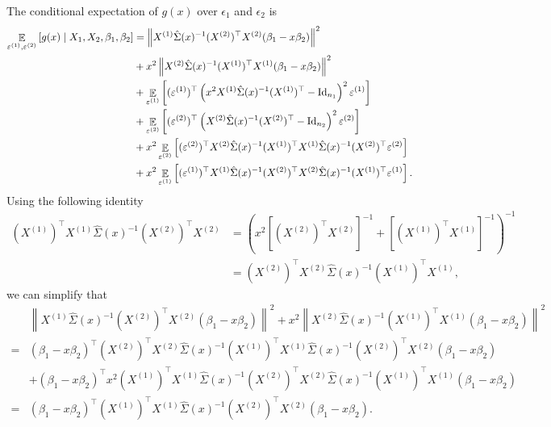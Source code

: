 The conditional expectation of $g(x)$ over $\epsilon_1$ and $\epsilon_2$ is
\begin{align}
\mathop{\mathbb{E}}_{\varepsilon^{(1)}, \varepsilon^{(2)}}\left[ g(x) \mid X_1, X_2 ,\beta_1,\beta_2 \right]
&= \left\| X^{(1)} \hat\Sigma(x)^{-1} (X^{(2)})^\top X^{(2)} (\beta_1-x\beta_2)\right\|^2 \nonumber\\
&+x^2 \left\| X^{(2)} \hat\Sigma(x)^{-1} (X^{(1)})^\top X^{(1)} (\beta_1-x\beta_2)\right\|^2  \nonumber\\
& + \mathop{\mathbb{E}}_{\varepsilon^{(1)}}\left[ (\varepsilon^{(1)})^\top \left(x^2 X^{(1)}\hat \Sigma(x)^{-1} (X^{(1)})^\top-\operatorname{Id}_{n_1}\right)^2\varepsilon^{(1)} \right] \nonumber\\
&+\mathop{\mathbb{E}}_{ \varepsilon^{(2)}}\left[ (\varepsilon^{(2)})^\top \left(X^{(2)}\hat \Sigma(x)^{-1} (X^{(2)})^\top-\operatorname{Id}_{n_2}\right)^2\varepsilon^{(2)} \right]   \nonumber\\
&+  x^2 \mathop{\mathbb{E}}_{ \varepsilon^{(2)}}\left[  (\varepsilon^{(2)} )^\top X^{(2)}\hat \Sigma(x)^{-1}  (X^{(1)})^\top X^{(1)}\hat\Sigma(x)^{-1} (X^{(2)})^\top \varepsilon^{(2)} \right] \nonumber\\
& +x^2 \mathop{\mathbb{E}}_{ \varepsilon^{(1)}}\left[  (\varepsilon^{(1)})^\top X^{(1)}\hat \Sigma(x)^{-1}  (X^{(2)})^\top X^{(2)}\hat\Sigma(x)^{-1} (X^{(1)})^\top \varepsilon^{(1)}   \right]. \label{Eg(x)}
\end{align}
Using the following identity
\begin{align*}
(X^{(1)})^\top X^{(1)} \hat \Sigma(x)^{-1}(X^{(2)})^\top X^{(2)} & =\left( x^2 [(X^{(2)})^\top X^{(2)}]^{-1} + [(X^{(1)})^\top X^{(1)}]^{-1} \right)^{-1} \\
&= (X^{(2)})^\top X^{(2)} \hat \Sigma(x)^{-1}(X^{(1)})^\top X^{(1)},
\end{align*}
we can simplify that
\begin{align*}
 & \left\| X^{(1)} \hat\Sigma(x)^{-1} (X^{(2)})^\top X^{(2)} (\beta_1-x\beta_2)\right\|^2  +x^2 \left\| X^{(2)} \hat\Sigma(x)^{-1} (X^{(1)})^\top X^{(1)} (\beta_1-x\beta_2)\right\|^2 \\
=&(\beta_1-x\beta_2)^\top (X^{(2)})^\top X^{(2)}  \hat\Sigma(x)^{-1} (X^{(1)} )^\top X^{(1)}  \hat\Sigma(x)^{-1} (X^{(2)})^\top X^{(2)}  (\beta_1-x\beta_2)\\
&+(\beta_1-x\beta_2)^\top x^2 (X^{(1)})^\top X^{(1)}  \hat\Sigma(x)^{-1} (X^{(2)} )^\top X^{(2)}  \hat\Sigma(x)^{-1} (X^{(1)})^\top X^{(1)} (\beta_1-x\beta_2)\\
=&(\beta_1-x\beta_2)^\top(X^{(1)} )^\top X^{(1)}  \hat\Sigma(x)^{-1} (X^{(2)})^\top X^{(2)} (\beta_1-x\beta_2).
\end{align*}

